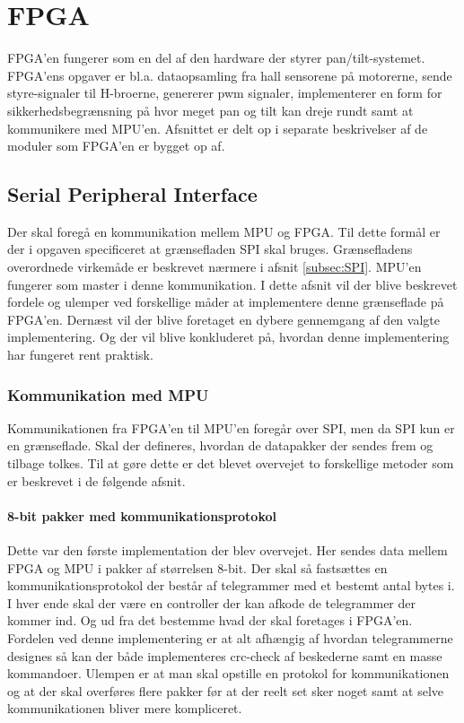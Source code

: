 \section{FPGA}
FPGA'en fungerer som en del af den hardware der styrer pan/tilt-systemet. FPGA'ens opgaver er bl.a. dataopsamling fra hall sensorene på motorerne, sende styre-signaler til H-broerne, genererer pwm signaler, implementerer en form for sikkerhedsbegrænsning på hvor meget pan og tilt kan dreje rundt samt at kommunikere med MPU'en. Afsnittet er delt op i separate beskrivelser af de moduler som FPGA'en er bygget op af. \\

\subsection{Serial Peripheral Interface}
Der skal foregå en kommunikation mellem MPU og FPGA. Til dette formål er der i opgaven specificeret at grænsefladen SPI skal bruges. Grænsefladens overordnede virkemåde er beskrevet nærmere i afsnit \ref{subsec:SPI}. MPU'en fungerer som master i denne kommunikation. I dette afsnit vil der blive beskrevet fordele og ulemper ved forskellige måder at implementere denne grænseflade på FPGA'en. Dernæst vil der blive foretaget en dybere gennemgang af den valgte implementering. Og der vil blive konkluderet på, hvordan denne implementering har fungeret rent praktisk.

\subsubsection{Kommunikation med MPU}
Kommunikationen fra FPGA'en til MPU'en foregår over SPI, men da SPI kun er en grænseflade. Skal der defineres, hvordan de datapakker der sendes frem og tilbage tolkes. Til at gøre dette er det blevet overvejet to forskellige metoder som er beskrevet i de følgende afsnit.

\paragraph*{8-bit pakker med kommunikationsprotokol}
Dette var den første implementation der blev overvejet. Her sendes data mellem FPGA og MPU i pakker af størrelsen 8-bit. Der skal så fastsættes en kommunikationsprotokol der består af telegrammer med et bestemt antal bytes i.\\
I hver ende skal der være en controller der kan afkode de telegrammer der kommer ind. Og ud fra det bestemme hvad der skal foretages i FPGA'en. Fordelen ved denne implementering er at alt afhængig af hvordan telegrammerne designes så kan der både implementeres crc-check af beskederne samt en masse kommandoer. Ulempen er at man skal opstille en protokol for kommunikationen og at der skal overføres flere pakker før at der reelt set sker noget samt at selve kommunikationen bliver mere kompliceret.

